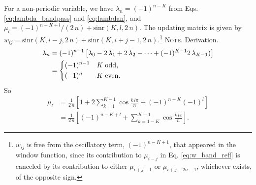 \documentclass[preprint, superscriptaddress, floatfix]{revtex4-1}
\newcommand{\note}[1]{{\color{DarkGreen}\footnotesize \textsc{Note.} #1}}
\begin{document}
For a non-periodic variable,
we have $\lambda_n = (-1)^{n-K}$
from Eqs. \eqref{eq:lambda_bandpass} and \eqref{eq:lambdan},
and $\mu_l = (-1)^{n-K+l}/(2 \, n) + \mathrm{sinr}(K, l, 2 \, n)$.
%
The updating matrix is given by
$w_{ij} = \mathrm{sinr}(K, i-j, 2 \, n) + \mathrm{sinr}(K, i+j-1, 2 \, n)$.\footnote{$w_{ij}$
  is free from the oscillatory term, $(-1)^{n-K+1}$,
  that appeared in the window function, since
  its contribution to $\mu_{i-j}$ in Eq. \eqref{eq:w_band_refl}
  is canceled by its contribution to either $\mu_{i+j-1}$
  or $\mu_{i+j-2n-1}$,
  whichever exists, of the opposite sign.}
%
\note{Derivation.
\begin{align*}
  \lambda_{n}
  &=
  (-1)^{n-1}
  \left[
    \lambda_0
    - 2 \, \lambda_1
    + 2 \, \lambda_2 - \cdots
    + (-1)^{K-1} 2 \, \lambda_{K-1})
  \right]
  \\
  &=
  \begin{dcases}
    (-1)^{n-1} & K \mathrm{\; odd,} \\
    (-1)^n     & K \mathrm{\; even.}
  \end{dcases}
\end{align*}
So
\begin{align*}
  \mu_l
  &=
  \frac{1}{2\,n}
  \left[
    1 +
    2 \sum_{k=1}^{K-1}
    \cos \frac { k \, l \pi } { n }
    +
    (-1)^{n-K} (-1)^l
  \right]
  \\
  &=
  \frac{1}{2\,n}
  \left[
    (-1)^{n-K+l}
    +
    \sum_{k=1-K}^{K-1}
    \cos \frac { k \, l \pi } { n }
  \right]
  .
\end{align*}
}%
\end{document}

